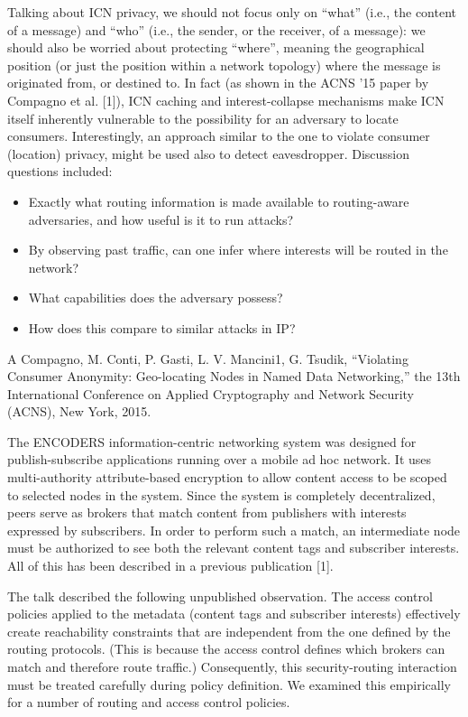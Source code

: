 \documentclass[a4paper,UKenglish]{dagrep}
\begin{document}
Talking about ICN privacy, we should not focus only on ``what'' (i.e., the content of a message) and ``who'' (i.e., the sender, or the receiver, of a message): we should also be worried about protecting ``where'', meaning the geographical position (or just the position within a network topology) where the message is originated from, or destined to. In fact (as shown in the ACNS '15 paper by Compagno et al. [1]), ICN caching and interest-collapse mechanisms make ICN itself inherently vulnerable to the possibility for an adversary to locate consumers.
Interestingly, an approach similar to the one to violate consumer (location) privacy, might be used also to detect eavesdropper.
Discussion questions included:
\begin{itemize}
\item Exactly what routing information is made available to routing-aware adversaries, and how useful is it to run attacks?
\item By observing past traffic, can one infer where interests will be routed in the network?
\item What capabilities does the adversary possess?
\item How does this compare to similar attacks in IP?
\end{itemize}

\begin{thebibliography}{0}
\bibitem{[1]} A Compagno, M. Conti, P. Gasti, L. V. Mancini1, G. Tsudik, ``Violating Consumer Anonymity: Geo-locating Nodes in Named Data Networking,'' the 13th International Conference on Applied Cryptography and Network Security (ACNS), New York, 2015.
\end{thebibliography}

\license

The ENCODERS information-centric networking system was designed for publish-subscribe applications running over a mobile ad hoc network. It uses multi-authority attribute-based encryption to allow content access to be scoped to selected nodes in the system. Since the system is completely decentralized, peers serve as brokers that match content from publishers with interests expressed by subscribers. In order to perform such a match, an intermediate node must be authorized to see both the relevant content tags and  subscriber interests. All of this has been described in a previous publication [1].

The talk described the following unpublished observation. The access control policies applied to the metadata (content tags and subscriber interests) effectively create reachability constraints that are independent from the one defined by the routing protocols. (This is because the access control defines which brokers can match and therefore route traffic.) Consequently, this security-routing interaction must be treated carefully during policy definition. We examined this empirically for a number of routing and access control policies.
\end{document}
